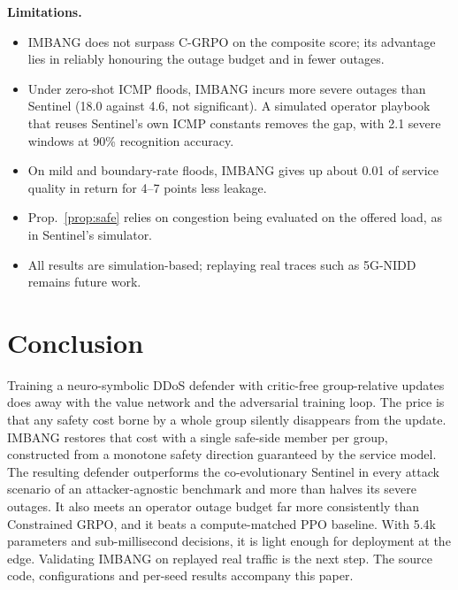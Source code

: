 \documentclass[conference]{IEEEtran}
\begin{document}
\textbf{Limitations.}
\begin{itemize}
\item IMBANG does not surpass C-GRPO on the composite score; its advantage lies in reliably honouring the outage budget and in fewer outages.
\item Under zero-shot ICMP floods, IMBANG incurs more severe outages than Sentinel (18.0 against 4.6, not significant). A simulated operator playbook that reuses Sentinel's own ICMP constants removes the gap, with 2.1 severe windows at 90\% recognition accuracy.
\item On mild and boundary-rate floods, IMBANG gives up about 0.01 of service quality in return for 4--7 points less leakage.
\item Prop.~\ref{prop:safe} relies on congestion being evaluated on the offered load, as in Sentinel's simulator.
\item All results are simulation-based; replaying real traces such as 5G-NIDD remains future work.
\end{itemize}

\section{Conclusion}
Training a neuro-symbolic DDoS defender with critic-free group-relative updates does away with the value network and the adversarial training loop. The price is that any safety cost borne by a whole group silently disappears from the update. IMBANG restores that cost with a single safe-side member per group, constructed from a monotone safety direction guaranteed by the service model. The resulting defender outperforms the co-evolutionary Sentinel in every attack scenario of an attacker-agnostic benchmark and more than halves its severe outages. It also meets an operator outage budget far more consistently than Constrained GRPO, and it beats a compute-matched PPO baseline. With 5.4k parameters and sub-millisecond decisions, it is light enough for deployment at the edge. Validating IMBANG on replayed real traffic is the next step. The source code, configurations and per-seed results accompany this paper.



\end{document}
